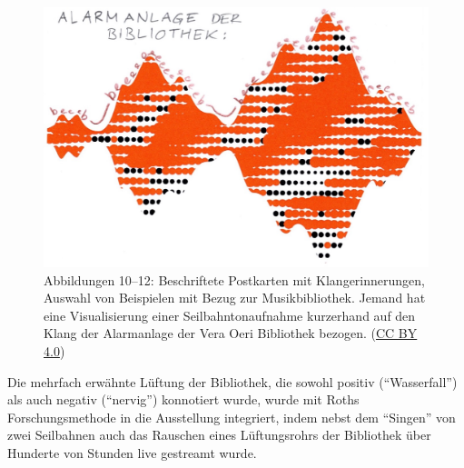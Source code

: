 \documentclass[a4paper,
fontsize=11pt,
oneside,
numbers=noperiodatend,
parskip=half-,
bibliography=totoc,
final
]{scrartcl}
\begin{document}
\begin{figure}[h]
\begin{minipage}[b]{0.32\textwidth}
        \includegraphics[width=\textwidth]{img/Abb12.jpg}
    \end{minipage}
            \caption{Abbildungen 10--12: Beschriftete Postkarten mit Klangerinnerungen, Auswahl von Beispielen mit Bezug zur Musikbibliothek. Jemand hat eine Visualisierung einer Seilbahntonaufnahme kurzerhand auf den Klang der Alarmanlage der Vera Oeri Bibliothek bezogen. (\href{https://creativecommons.org/licenses/by/4.0/}{CC BY 4.0})}
\end{figure}


Die mehrfach erwähnte Lüftung der Bibliothek, die sowohl positiv
(\enquote{Wasserfall}) als auch negativ (\enquote{nervig}) konnotiert
wurde, wurde mit Roths Forschungsmethode in die Ausstellung integriert,
indem nebst dem \enquote{Singen} von zwei Seilbahnen auch das Rauschen
eines Lüftungsrohrs der Bibliothek über Hunderte von Stunden live
gestreamt wurde.
\end{document}
